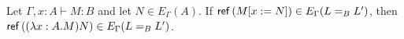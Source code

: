 


\begin{lm}
\label{lm:wte1}
Let $\Gamma, x : A \vdash M : B$ and let $N \in E_\Gamma(A)$.  If $\mathsf{ref} \left( {M[x:=N]} \right) \in E_\Gamma(L =_B L')$, then
$\mathsf{ref} \left( {(\lambda x:A.M)N} \right) \in E_\Gamma(L =_B L')$.
\end{lm}

